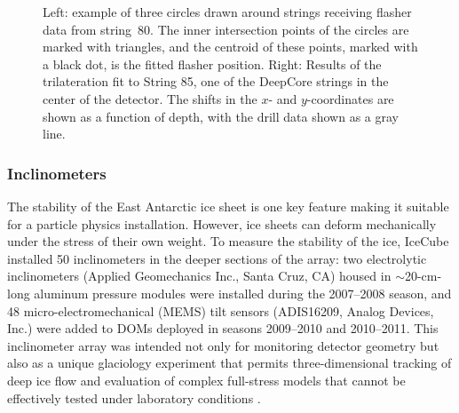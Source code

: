 \begin{figure}[!ht]
  \captionsetup[subfigure]{labelformat=empty} \centering
  \caption{Left: example of three circles drawn around strings
    receiving flasher data from string~80. The inner intersection
    points of the circles are marked with triangles, and the centroid
    of these points, marked with a black dot, is the fitted flasher
    position.  Right: Results of the trilateration fit to String 85, one of
    the DeepCore strings in the center of the detector. The shifts in the
    $x$- and $y$-coordinates are shown as a function of depth, with the drill
    data shown as a gray line.}
  \label{fig:trilateration}
\end{figure}


\subsubsection{Inclinometers}

The stability of the East Antarctic ice sheet is one key feature making it
suitable for a particle physics installation.  However, ice sheets can
deform mechanically under the stress of their own weight.  To measure the
stability of the ice, IceCube installed 50
inclinometers in the deeper sections of the array: two 
electrolytic inclinometers (Applied Geomechanics Inc., Santa Cruz, CA)
housed in $\sim$20-cm-long aluminum pressure modules were installed during
the 2007--2008 season, and 48 micro-electromechanical (MEMS) tilt sensors
(ADIS16209, Analog Devices, Inc.) were added to DOMs deployed in seasons
2009--2010 and 2010--2011.  This inclinometer array was intended not only for monitoring
detector geometry but also as a unique glaciology experiment that
permits three-dimensional tracking of deep ice flow and evaluation of complex
full-stress models that cannot be effectively tested under laboratory
conditions \cite{pattyn03}.


